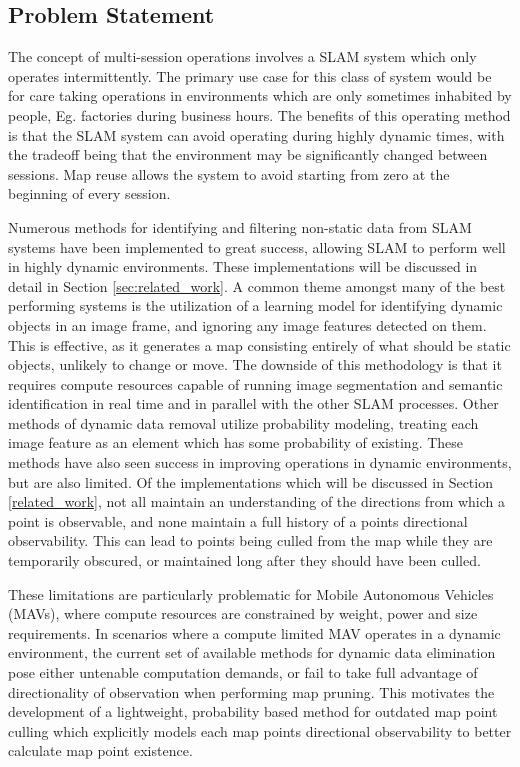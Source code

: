 \subsection{Problem Statement}


The concept of multi-session operations involves a SLAM system which only operates intermittently. The primary use case for this class of system would be for care taking operations in environments which are only sometimes inhabited by people, Eg. factories during business hours. The benefits of this operating method is that the SLAM system can avoid operating during highly dynamic times, with the tradeoff being that the environment may be significantly changed between sessions. Map reuse allows the system to avoid starting from zero at the beginning of every session.

Numerous methods for identifying and filtering non-static data from SLAM systems have been implemented to great success, allowing SLAM to perform well in highly dynamic environments. These implementations will be discussed in detail in Section \ref{sec:related_work}. A common theme amongst many of the best performing systems is the utilization of a learning model for identifying dynamic objects in an image frame, and ignoring any image features detected on them. This is effective, as it generates a map consisting entirely of what should be static objects, unlikely to change or move. The downside of this methodology is that it requires compute resources capable of running image segmentation and semantic identification in real time and in parallel with the other SLAM processes. Other methods of dynamic data removal utilize probability modeling, treating each image feature as an element which has some probability of existing. These methods have also seen success in improving operations in dynamic environments, but are also limited. Of the implementations which will be discussed in Section \ref{related_work}, not all maintain an understanding of the directions from which a point is observable, and none maintain a full history of a points directional observability. This can lead to points being culled from the map while they are temporarily obscured, or maintained long after they should have been culled.

These limitations are particularly problematic for Mobile Autonomous Vehicles (MAVs), where compute resources are constrained by weight, power and size requirements. In scenarios where a compute limited MAV operates in a dynamic environment, the current set of available methods for dynamic data elimination pose either untenable computation demands, or fail to take full advantage of directionality of observation when performing map pruning. This motivates the development of a lightweight, probability based method for outdated map point culling which explicitly models each map points directional observability to better calculate map point existence.

